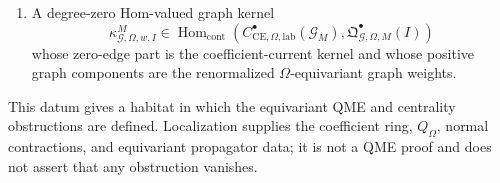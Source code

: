 \begin{defn}
\begin{enumerate}[label={(\(\Omega\arabic*\))}]
    \item A degree-zero Hom-valued graph kernel
      \[
        \kappa^M_{\mathcal G,\Omega,w,I}
        \in
        \operatorname{Hom}_{\mathrm{cont}}
        \left(
          C^\bullet_{\mathrm{CE},\Omega,\mathrm{lab}}(\mathcal G_M),
          \mathfrak Q^\bullet_{\mathcal G,\Omega,M}(I)
        \right)
      \]
      whose zero-edge part is the coefficient-current kernel and whose
      positive graph components are the renormalized
      \(\Omega\)-equivariant graph weights.
  \end{enumerate}
  This datum gives a habitat in which the equivariant QME and centrality
  obstructions are defined.  Localization supplies the coefficient ring,
  \(Q_\Omega\), normal contractions, and equivariant propagator data; it is
  not a QME proof and does not assert that any obstruction vanishes.
\end{defn}

